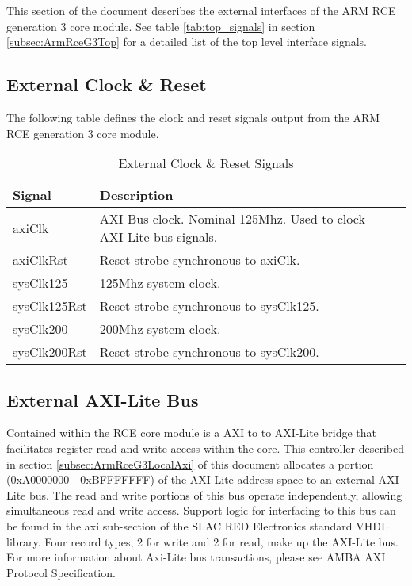 \documentclass[11pt]{article}
\begin{document}
This section of the document describes the external interfaces of the ARM RCE generation 3 core module. See
table \ref{tab:top_signals} in section \ref{subsec:ArmRceG3Top} for a detailed list of the top level interface signals.

\subsection{External Clock \& Reset}
\label{subsec:external_clock_reset}

The following table defines the clock and reset signals output from the ARM RCE generation 3 core module.

\begin{table}[H]
\small
\centering
   \begin{tabular}{| l | l | l | }
      \hline \textbf{Signal} & \textbf{Description} \\
      \hline axiClk          & AXI Bus clock. Nominal 125Mhz. Used to clock AXI-Lite bus signals.      \\
      \hline axiClkRst       & Reset strobe synchronous to axiClk.                                  \\
      \hline sysClk125       & 125Mhz system clock.  \\
      \hline sysClk125Rst    & Reset strobe synchronous to sysClk125.                               \\
      \hline sysClk200       & 200Mhz system clock.  \\
      \hline sysClk200Rst    & Reset strobe synchronous to sysClk200.                               \\
      \hline
   \end{tabular}
   \caption{External Clock \& Reset Signals}
\end{table}

\subsection{External AXI-Lite Bus}
\label{subsec:external_axi_bus}

Contained within the RCE core module is a AXI to to AXI-Lite bridge that facilitates register read and write access within the core. 
This controller described in section \ref{subsec:ArmRceG3LocalAxi} of this document allocates a portion (0xA0000000 - 0xBFFFFFFF) of the AXI-Lite address space to an external AXI-Lite bus. The read and write portions of this bus operate independently, allowing simultaneous read and write access. Support logic for interfacing to this bus can be found in the axi sub-section of the SLAC RED Electronics standard VHDL library. Four record types, 2 for write and 2 for read, make up the AXI-Lite bus. For more information about Axi-Lite bus transactions, please see AMBA AXI Protocol Specification.
\end{document}
